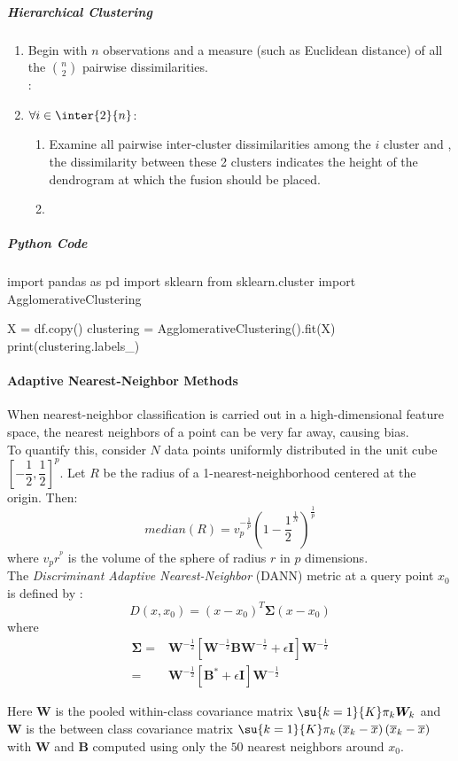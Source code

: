 \subparagraph{Hierarchical Clustering}
\begin{enumerate}
	\item Begin with $n$ observations and a measure (such as 
		Euclidean distance) of all the $\binom{n}{2}$ pairwise
		dissimilarities.\\ :
	\item $\forall i\in\inter{2}{n}$:
		\begin{enumerate}
			\item Examine all pairwise inter-cluster 
				dissimilarities among the $i$ cluster
				and , the dissimilarity
				between these 2 clusters indicates
				the height of the dendrogram at which
				the fusion should be placed.
			\item {}

		\end{enumerate}
\end{enumerate}

\subparagraph{Python Code}
\begin{python}
import pandas as pd
import sklearn
from sklearn.cluster import AgglomerativeClustering

X = df.copy()
clustering = AgglomerativeClustering().fit(X)
print(clustering.labels_)
\end{python}
\paragraph{Adaptive Nearest-Neighbor Methods}
When nearest-neighbor classification is carried out in a high-dimensional feature space, the
nearest neighbors of a point can be very far away, causing bias.\\
To quantify this, consider $N$ data points uniformly distributed in the unit cube $\left[-\dfrac{
1}{2},\dfrac{1}{2}\right]^{p}$. Let $R$ be the radius of a 1-nearest-neighborhood centered at the
origin. Then:
$$ median(R)=v_{p}^{-\frac{1}{p}}\left(1-\dfrac{1}{2}^{\frac{1}{N}}\right)^{\frac{1}{p}}$$ where
$v_{p}r^{^p}$ is the volume of the sphere of radius $r$ in $p$ dimensions.\\

The \emph{Discriminant Adaptive Nearest-Neighbor} (DANN) metric at a query point $x_{0}$ is 
defined by : 
$$ D(x, x_{0}) = (x-x_{0})^{T}\bm{\Sigma}(x-x_{0})$$ where 
\begin{align*}
	\bm{\Sigma} =& \bm{W}^{-\frac{1}{2}}\left[\bm{W}^{-\frac{1}{2}}\bm{B}\bm{W}^{-\frac{1}{2}}
	+\epsilon \bm{I}\right]\bm{W}^{-\frac{1}{2}}\\
	=& \bm{W}^{-\frac{1}{2}}\left[\bm{B}^{*}+\epsilon\bm{I}\right]\bm{W}^{-\frac{1}{2}}
\end{align*}

Here $\bm{W}$ is the pooled within-class covariance matrix $\su{{k=1}}{K}\pi_{k}\bm{W}_{k}$ and
$\bm{W}$ is the between class covariance matrix $\su{{k=1}}{K}\pi_{k}\left(\overline{x}_{k}-
\overline{x}\right)\left(\overline{x}_{k}-\overline{x}\right)$ with $\bm{W}$ and $\bm{B}$
computed using only the $50$ nearest neighbors around $x_{0}$.
